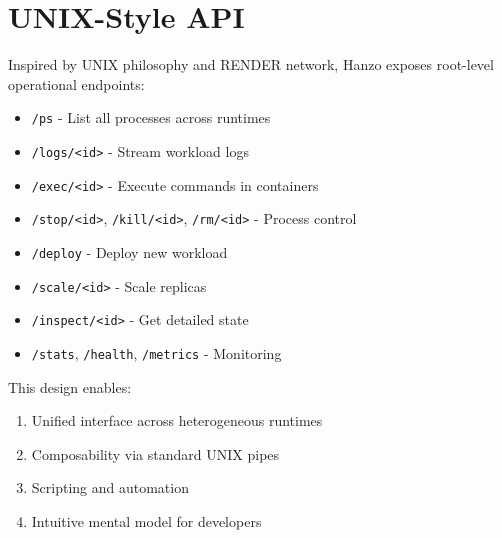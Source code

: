 \section{UNIX-Style API}


Inspired by UNIX philosophy and RENDER network, Hanzo exposes root-level operational endpoints:

\begin{itemize}
\item \texttt{/ps} - List all processes across runtimes
\item \texttt{/logs/<id>} - Stream workload logs
\item \texttt{/exec/<id>} - Execute commands in containers
\item \texttt{/stop/<id>}, \texttt{/kill/<id>}, \texttt{/rm/<id>} - Process control
\item \texttt{/deploy} - Deploy new workload
\item \texttt{/scale/<id>} - Scale replicas
\item \texttt{/inspect/<id>} - Get detailed state
\item \texttt{/stats}, \texttt{/health}, \texttt{/metrics} - Monitoring
\end{itemize}

This design enables:
\begin{enumerate}
\item Unified interface across heterogeneous runtimes
\item Composability via standard UNIX pipes
\item Scripting and automation
\item Intuitive mental model for developers
\end{enumerate}

